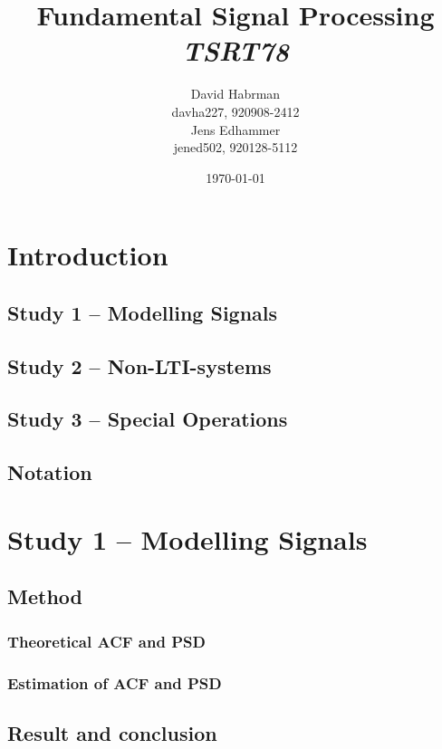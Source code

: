 \documentclass[10pt]{article}
\title{Fundamental Signal Processing\\
\emph{TSRT78}}
\author{David Habrman \\ davha227, 920908-2412\\
Jens Edhammer \\ jened502, 920128-5112 }
\date{\today}
\begin{document}
\maketitle

\newpage
\tableofcontents
\newpage

\section{Introduction}

\subsection{Study 1 – Modelling Signals}

\subsection{Study 2 – Non-LTI-systems}


\subsection{Study 3 – Special Operations}


\subsection{Notation}


\section{Study 1 – Modelling Signals}
\subsection{Method}

\subsubsection{Theoretical ACF and PSD}

\subsubsection{Estimation of ACF and PSD}

\subsection{Result and conclusion}
\end{document}
